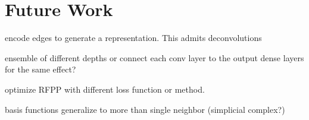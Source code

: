 \chapter{Future Work}
\label{chap:future}

encode edges to generate a representation. This admits deconvolutions

ensemble of different depths or connect each conv layer to the output dense layers for the same effect?

optimize RFPP with different loss function or method.

basis functions
generalize to more than single neighbor (simplicial complex?)